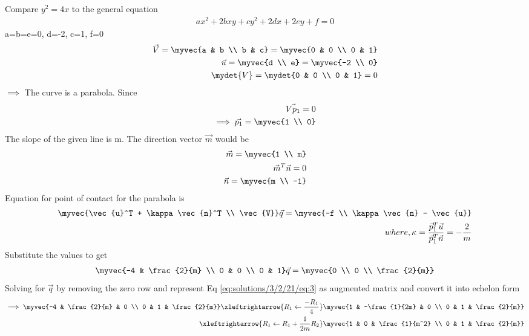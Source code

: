 Compare $y^2 = 4x$ to the general equation
\begin{align}
    ax^2 + 2bxy + cy^2 + 2dx + 2ey + f = 0
\end{align}
a=b=e=0, d=-2, c=1, f=0
\begin{align}
  \vec{V} = \myvec{a & b \\ b & c} = \myvec{0 & 0 \\ 0 & 1}\\
  \vec{u} = \myvec{d \\ e} = \myvec{-2 \\ 0}\\
  \mydet{V} = \mydet{0 & 0 \\ 0 & 1} = 0
\end{align}
 $\implies$ The curve is a parabola. Since
\begin{align}
     \vec{Vp_{1}} = 0\\
    \implies \vec{p_{1}} = \myvec{1 \\ 0}
\end{align}
The slope of the given line is m. The direction vector $\vec{m}$ would be
\begin{align}
   \vec{m} = \myvec{1 \\ m}\\
   \vec{m}^T\vec{n} = 0\\
   \vec{n} = \myvec{m \\ -1}
\end{align}
Equation for point of contact for the parabola is 
\begin{align}
    \myvec{\vec{u}^T + \kappa \vec{n}^T \\ \vec{V}}\vec{q} = \myvec{-f \\ \kappa \vec{n} - \vec{u}}\\
   where, \kappa = \frac{\vec{p}_{1}^T \vec{u}}{\vec{p}_{1}^T \vec{n}} = - \frac{2}{m}
\end{align}
Substitute the values to get
\begin{align}
   \myvec{-4 & \frac{2}{m} \\ 0 & 0 \\ 0 & 1}\vec{q} = \myvec{0 \\ 0 \\ \frac{2}{m}} \label{eq:solutions/3/2/21/eq:3}
\end{align}
Solving for $\vec{q}$ by removing the zero row and represent Eq \eqref{eq:solutions/3/2/21/eq:3} as augmented matrix and convert it into echelon form
\begin{align}
\implies \myvec{-4 & \frac{2}{m} & 0 \\ 0 & 1 & \frac{2}{m}}
\xleftrightarrow{R_1\leftarrow \frac{-R_1}{4}}
\myvec{1 & -\frac{1}{2m} & 0 \\ 0 & 1 & \frac{2}{m}}\\
\xleftrightarrow{R_1\leftarrow R_1 + \frac{1}{2m}R_2}
\myvec{1 & 0 & \frac{1}{m^2} \\ 0 & 1 & \frac{2}{m}}\\
\end{align}
